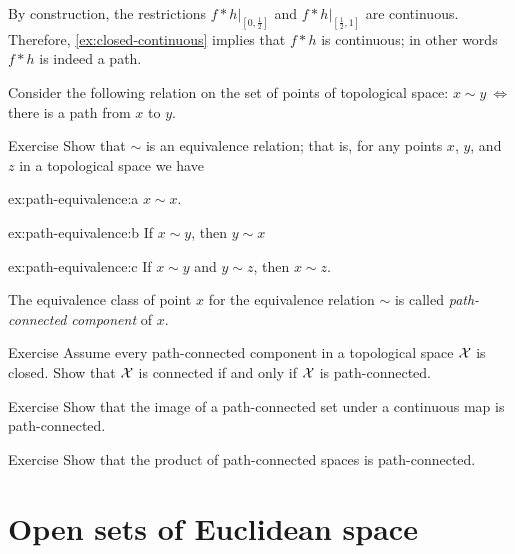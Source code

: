 By construction, the restrictions $f*h|_{[0,\frac12]}$ and $f*h|_{[\frac12,1]}$ are continuous. 
Therefore, \ref{ex:closed-continuous} implies that $f*h$ is continuous;
in other words $f*h$ is indeed a path.

Consider the following relation on the set of points of topological space:  $x\sim y\ \Leftrightarrow$  there is a path from $x$ to $y$.

\begin{thm}{Exercise}\label{ex:path-equivalence}
Show that $\sim$ is an equivalence relation;
that is, for any points $x$, $y$, and $z$ in a topological space we have

\begin{subthm}{ex:path-equivalence:a}
$x\sim x$.
\end{subthm}

\begin{subthm}{ex:path-equivalence:b}
If $x\sim y$, then $y\sim x$
\end{subthm}

\begin{subthm}{ex:path-equivalence:c}
If $x\sim y$ and $y\sim z$, then $x\sim z$.
\end{subthm}

\end{thm}

The equivalence class of point $x$ for the equivalence relation $\sim$ is called \emph{path-connected component} of $x$. 

\begin{thm}{Exercise}\label{ex:path-connected-component-closed-open}
Assume every path-connected component in a topological space $\mathcal{X}$ is closed.
Show that $\mathcal{X}$ is connected if and only if $\mathcal{X}$ is path-connected.
\end{thm}

\begin{thm}{Exercise}\label{ex:image(path-connected)}
Show that the image of a path-connected set under a continuous map is path-connected.
\end{thm}

\begin{thm}{Exercise}\label{ex:product(path-connected)}
Show that the product of path-connected spaces is path-connected.
\end{thm}

\section{Open sets of Euclidean space}

